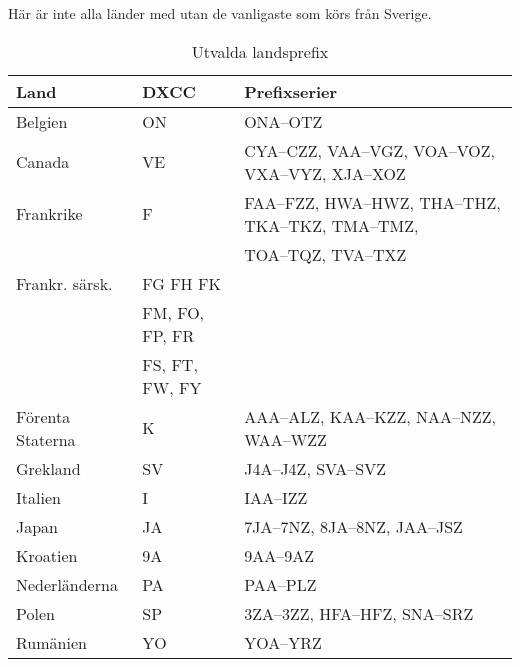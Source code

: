 Här är inte alla länder med utan de vanligaste som körs från Sverige.

\begin{center}
  \begin{footnotesize}
    \begin{longtable}{lll}
      \caption{Utvalda landsprefix} \\
      \textbf{Land}                 & \textbf{DXCC}  & \textbf{Prefixserier}                             \\ \hline
			Belgien                       & ON             & ONA--OTZ                                          \\
			Canada                        & VE             & CYA--CZZ, VAA--VGZ, VOA--VOZ, VXA--VYZ, XJA--XOZ  \\
			Frankrike                     & F              & FAA--FZZ, HWA--HWZ, THA--THZ, TKA--TKZ, TMA--TMZ, \\
			                              &                & TOA--TQZ, TVA--TXZ                                \\
			Frankr. särsk.                & FG FH FK       &                                                   \\
			                              & FM, FO, FP, FR &                                                   \\
			                              & FS, FT, FW, FY &                                                   \\
			Förenta Staterna              & K              & AAA--ALZ, KAA--KZZ, NAA--NZZ, WAA--WZZ            \\
			Grekland                      & SV             & J4A--J4Z, SVA--SVZ                                \\
			Italien                       & I              & IAA--IZZ                                          \\
			Japan                         & JA             & 7JA--7NZ, 8JA--8NZ, JAA--JSZ                      \\
			Kroatien                      & 9A             & 9AA--9AZ                                          \\
			Nederländerna                 & PA             & PAA--PLZ                                          \\
			Polen                         & SP             & 3ZA--3ZZ, HFA--HFZ, SNA--SRZ                      \\
			Rumänien                      & YO             & YOA--YRZ                                          \\

\end{longtable}
\end{footnotesize}
\end{center}
